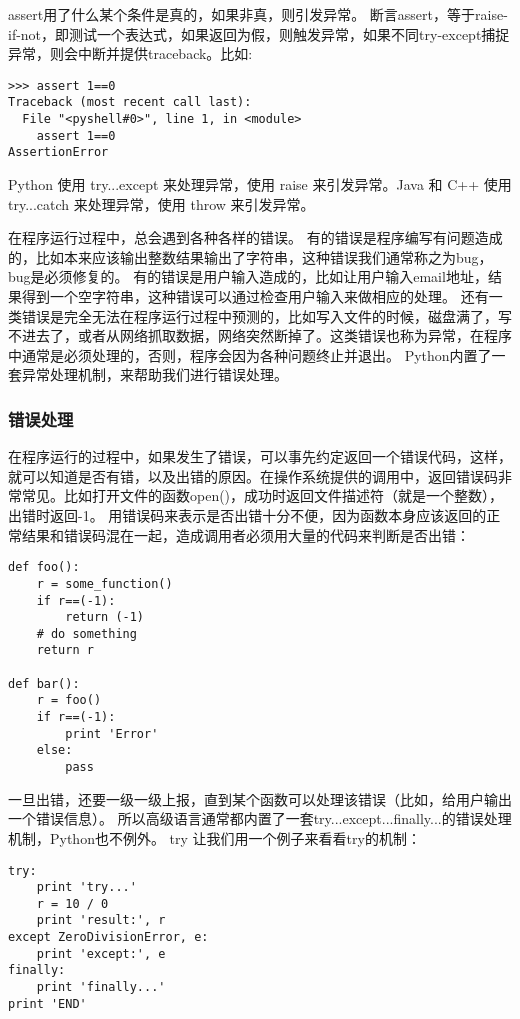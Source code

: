 \documentclass[twoside,11pt]{book}
\begin{document}
assert用了什么某个条件是真的，如果非真，则引发异常。
断言assert，等于raise-if-not，即测试一个表达式，如果返回为假，则触发异常，如果不同try-except捕捉异常，则会中断并提供traceback。比如:
\begin{lstlisting}
>>> assert 1==0
Traceback (most recent call last):
  File "<pyshell#0>", line 1, in <module>
    assert 1==0
AssertionError
\end{lstlisting}

Python 使用 try...except 来处理异常，使用 raise 来引发异常。Java 和 C++ 使用
try...catch 来处理异常，使用 throw 来引发异常。

在程序运行过程中，总会遇到各种各样的错误。
有的错误是程序编写有问题造成的，比如本来应该输出整数结果输出了字符串，这种错误我们通常称之为bug，bug是必须修复的。
有的错误是用户输入造成的，比如让用户输入email地址，结果得到一个空字符串，这种错误可以通过检查用户输入来做相应的处理。
还有一类错误是完全无法在程序运行过程中预测的，比如写入文件的时候，磁盘满了，写不进去了，或者从网络抓取数据，网络突然断掉了。这类错误也称为异常，在程序中通常是必须处理的，否则，程序会因为各种问题终止并退出。
Python内置了一套异常处理机制，来帮助我们进行错误处理。

\subsubsection{错误处理}
在程序运行的过程中，如果发生了错误，可以事先约定返回一个错误代码，这样，就可以知道是否有错，以及出错的原因。在操作系统提供的调用中，返回错误码非常常见。比如打开文件的函数open()，成功时返回文件描述符（就是一个整数），出错时返回-1。
用错误码来表示是否出错十分不便，因为函数本身应该返回的正常结果和错误码混在一起，造成调用者必须用大量的代码来判断是否出错：
\begin{lstlisting}
def foo():
    r = some_function()
    if r==(-1):
        return (-1)
    # do something
    return r

def bar():
    r = foo()
    if r==(-1):
        print 'Error'
    else:
        pass
\end{lstlisting}

一旦出错，还要一级一级上报，直到某个函数可以处理该错误（比如，给用户输出一个错误信息）。
所以高级语言通常都内置了一套try...except...finally...的错误处理机制，Python也不例外。
try
让我们用一个例子来看看try的机制：
\begin{lstlisting}
try:
    print 'try...'
    r = 10 / 0
    print 'result:', r
except ZeroDivisionError, e:
    print 'except:', e
finally:
    print 'finally...'
print 'END'
\end{lstlisting}
\end{document}
